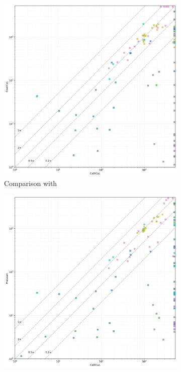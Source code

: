 \begin{figure}[!t]
    \centering
    \begin{subfigure}[t]{0.3\textwidth}
            \centering
            \includegraphics[width=\textwidth]{figs/cadical_vs_cautical_interesting.jpg}
            \caption{Comparison with \cadical}
            \label{fig:cautical-vs-cadical}
    \end{subfigure}
    \begin{subfigure}[t]{0.3\textwidth}
        \centering
        \includegraphics[width=\textwidth]{figs/prelearn_vs_cadical_interesting.jpg}

\end{subfigure}
\end{figure}
